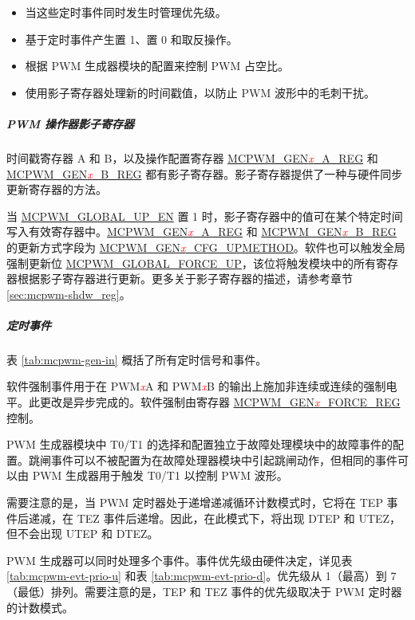 \documentclass[main\_\_CN.tex]{subfiles}
\begin{document}
\begin{itemize}
\begin{itemize}
    \end{itemize}
    \item 当这些定时事件同时发生时管理优先级。
    \item 基于定时事件产生置 1、置 0 和取反操作。
    \item 根据 PWM 生成器模块的配置来控制 PWM 占空比。
    \item 使用影子寄存器处理新的时间戳值，以防止 PWM 波形中的毛刺干扰。
\end{itemize}

\subparagraph{PWM 操作器影子寄存器}
时间戳寄存器 A 和 B，以及操作配置寄存器 \hyperref[regdesc:MCPWMGEN0AREG]{MCPWM\_GEN\textcolor{red}{\it{x}}\_A\_REG} 和 \hyperref[regdesc:MCPWMGEN0BREG]{MCPWM\_GEN\textcolor{red}{\it{x}}\_B\_REG} 都有影子寄存器。影子寄存器提供了一种与硬件同步更新寄存器的方法。

当 \hyperref[fielddesc:MCPWMGLOBALUPEN]{MCPWM\_GLOBAL\_UP\_EN} 置 1 时，影子寄存器中的值可在某个特定时间写入有效寄存器中。\hyperref[regdesc:MCPWMGEN0AREG]{MCPWM\_GEN\textcolor{red}{\it{x}}\_A\_REG} 和 \hyperref[regdesc:MCPWMGEN0BREG]{MCPWM\_GEN\textcolor{red}{\it{x}}\_B\_REG} 的更新方式字段为 \hyperref[fielddesc:MCPWMGEN0CFGUPMETHOD]{MCPWM\_GEN\textcolor{red}{\it{x}}\_CFG\_UPMETHOD}。软件也可以触发全局强制更新位 \hyperref[fielddesc:MCPWMGLOBALFORCEUP]{MCPWM\_GLOBAL\_FORCE\_UP}，该位将触发模块中的所有寄存器根据影子寄存器进行更新。更多关于影子寄存器的描述，请参考章节 \ref{sec:mcpwm-shdw_reg}。

\subparagraph{定时事件}
表 \ref{tab:mcpwm-gen-in} 概括了所有定时信号和事件。


 
软件强制事件用于在 PWM\textcolor{red}{\it{x}}A 和 PWM\textcolor{red}{\it{x}}B 的输出上施加非连续或连续的强制电平。此更改是异步完成的。软件强制由寄存器 \hyperref[regdesc:MCPWMGEN0FORCEREG]{MCPWM\_GEN\textcolor{red}{\it{x}}\_FORCE\_REG} 控制。

PWM 生成器模块中 T0/T1 的选择和配置独立于故障处理模块中的故障事件的配置。跳闸事件可以不被配置为在故障处理器模块中引起跳闸动作，但相同的事件可以由 PWM 生成器用于触发 T0/T1 以控制 PWM 波形。

需要注意的是，当 PWM 定时器处于递增递减循环计数模式时，它将在 TEP 事件后递减，在 TEZ 事件后递增。因此，在此模式下，将出现 DTEP 和 UTEZ，但不会出现 UTEP 和 DTEZ。

PWM 生成器可以同时处理多个事件。事件优先级由硬件决定，详见表 \ref{tab:mcpwm-evt-prio-u} 和表 \ref{tab:mcpwm-evt-prio-d}。优先级从 1（最高）到 7（最低）排列。需要注意的是，TEP 和 TEZ 事件的优先级取决于 PWM 定时器的计数模式。
\end{document}
